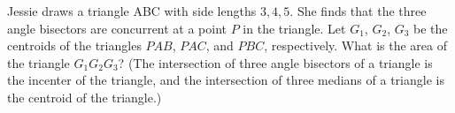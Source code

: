 Jessie draws a triangle ABC with side lengths $3, 4, 5$. She finds that the three angle bisectors are concurrent at a point $P$ in the triangle. Let $G_1$, $G_2$, $G_3$ be the centroids of the triangles $PAB$, $PAC$, and $PBC$, respectively. What is the area of the triangle $G_1G_2G_3$? (The intersection of three angle bisectors of a triangle is the incenter of the triangle, and the intersection of three medians of a triangle is the centroid of the triangle.)
